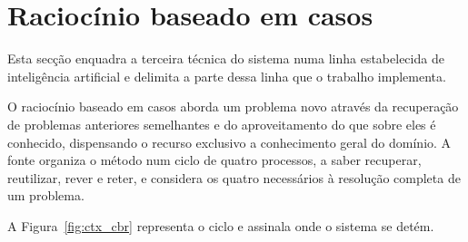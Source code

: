 \section{Raciocínio baseado em casos}
\label{sec:ctx_casos}

Esta secção enquadra a terceira técnica do sistema numa linha estabelecida de inteligência
artificial e delimita a parte dessa linha que o trabalho implementa.

O raciocínio baseado em casos \autocite{aamodt1994cbr} aborda um problema novo através da
recuperação de problemas anteriores semelhantes e do aproveitamento do que sobre eles é conhecido,
dispensando o recurso exclusivo a conhecimento geral do domínio. A fonte organiza o método num
ciclo de quatro processos, a saber recuperar, reutilizar, rever e reter, e considera os quatro
necessários à resolução completa de um problema.

A Figura~\ref{fig:ctx_cbr} representa o ciclo e assinala onde o sistema se detém.

